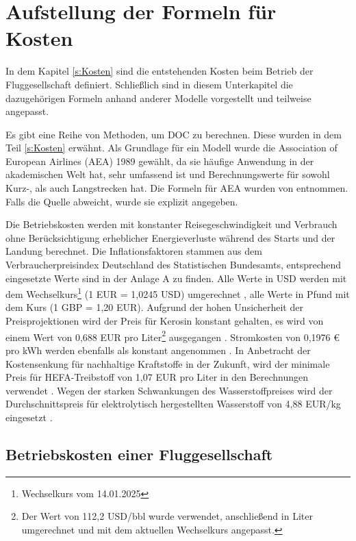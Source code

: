 \section{Aufstellung der Formeln für Kosten}
\label{s:Aufstellung der Formeln für Kosten}

In dem Kapitel \ref{s:Kosten} sind die entstehenden Kosten beim Betrieb der Fluggesellschaft definiert.
Schließlich sind in diesem Unterkapitel die dazugehörigen Formeln anhand anderer Modelle vorgestellt und teilweise angepasst. 

Es gibt eine Reihe von Methoden, um DOC zu berechnen. 
Diese wurden in dem Teil \ref{s:Kosten} erwähnt.
Als Grundlage für ein Modell wurde die Association of European Airlines (AEA) 1989 gewählt, 
da sie häufige Anwendung in der akademischen Welt hat, 
sehr umfassend ist und Berechnungswerte für sowohl Kurz-, als auch Langstrecken hat. 
Die Formeln für AEA wurden von \cite{minwoo2019analysis} entnommen.
Falls die Quelle abweicht, wurde sie explizit angegeben. %

Die Betriebskosten werden mit konstanter Reisegeschwindigkeit und Verbrauch ohne 
Berücksichtigung erheblicher Energieverluste während des Starts und der Landung berechnet. 
Die Inflationsfaktoren stammen aus dem Verbraucherpreisindex Deutschland des Statistischen Bundesamts, 
entsprechend eingesetzte Werte sind in der Anlage A zu finden. %
Alle Werte in USD werden mit dem Wechselkurs\footnote{Wechselkurs vom 14.01.2025} (1 EUR = 1,0245 USD)
umgerechnet \cite{ecb_exchange_rates_usd}, alle Werte in Pfund mit dem Kurs (1 GBP = 1,20 EUR).
Aufgrund der hohen Unsicherheit der Preisprojektionen wird der Preis für Kerosin 
konstant gehalten, es wird von einem Wert von 0,688 EUR pro Liter\footnote{Der Wert von 112,2 USD/bbl 
wurde verwendet, anschließend in Liter umgerechnet und mit dem aktuellen Wechselkurs angepasst.} 
ausgegangen \cite{iata_industry_statistics_2024}. 
Stromkosten von 0,1976 € pro kWh werden ebenfalls als konstant angenommen \cite{eurostat_nrg_pc_205}.
In Anbetracht der Kostensenkung für nachhaltige Kraftstoffe in der Zukunft, 
wird der minimale Preis für HEFA-Treibstoff von 1,07 EUR pro Liter in den Berechnungen verwendet \cite{watson2024sustainable}.
Wegen der starken Schwankungen des Wasserstoffpreises wird der Durchschnittspreis für 
elektrolytisch hergestellten Wasserstoff von 4,88 EUR/kg eingesetzt \cite{hoelzen2022hydrogen}.
%
%
\subsection{Betriebskosten einer Fluggesellschaft}

